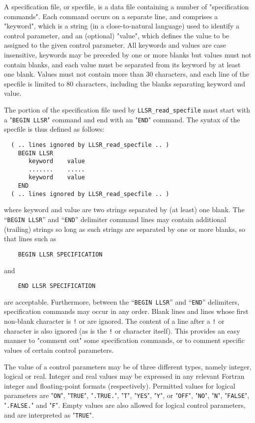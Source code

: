\documentclass{galahad}
\newcommand{\packagename}{LLSR}
\begin{document}
A specification file, or specfile, is a data file containing a number of
"specification commands". Each command occurs on a separate line,
and comprises a "keyword",
which is a string (in a close-to-natural language) used to identify a
control parameter, and
an (optional) "value", which defines the value to be assigned to the given
control parameter. All keywords and values are case insensitive,
keywords may be preceded by one or more blanks but
values must not contain blanks, and
each value must be separated from its keyword by at least one blank.
Values must not contain more than 30 characters, and
each line of the specfile is limited to 80 characters,
including the blanks separating keyword and value.

The portion of the specification file used by
{\tt \packagename\_read\_specfile}
must start
with a "{\tt BEGIN \packagename}" command and end with an
"{\tt END}" command.  The syntax of the specfile is thus defined as follows:
\begin{verbatim}
  ( .. lines ignored by LLSR_read_specfile .. )
    BEGIN LLSR
       keyword    value
       .......    .....
       keyword    value
    END
  ( .. lines ignored by LLSR_read_specfile .. )
\end{verbatim}
where keyword and value are two strings separated by (at least) one blank.
The ``{\tt BEGIN \packagename}'' and ``{\tt END}'' delimiter command lines
may contain additional (trailing) strings so long as such strings are
separated by one or more blanks, so that lines such as
\begin{verbatim}
    BEGIN LLSR SPECIFICATION
\end{verbatim}
and
\begin{verbatim}
    END LLSR SPECIFICATION
\end{verbatim}
are acceptable. Furthermore,
between the
``{\tt BEGIN \packagename}'' and ``{\tt END}'' delimiters,
specification commands may occur in any order.  Blank lines and
lines whose first non-blank character is {\tt !} or {\tt *} are ignored.
The content
of a line after a {\tt !} or {\tt *} character is also
ignored (as is the {\tt !} or {\tt *}
character itself). This provides an easy manner to "comment out" some
specification commands, or to comment specific values
of certain control parameters.

The value of a control parameters may be of three different types, namely
integer, logical or real.
Integer and real values may be expressed in any relevant Fortran integer and
floating-point formats (respectively). Permitted values for logical
parameters are "{\tt ON}", "{\tt TRUE}", "{\tt .TRUE.}", "{\tt T}",
"{\tt YES}", "{\tt Y}", or "{\tt OFF}", "{\tt NO}",
"{\tt N}", "{\tt FALSE}", "{\tt .FALSE.}" and "{\tt F}".
Empty values are also allowed for
logical control parameters, and are interpreted as "{\tt TRUE}".
\end{document}
